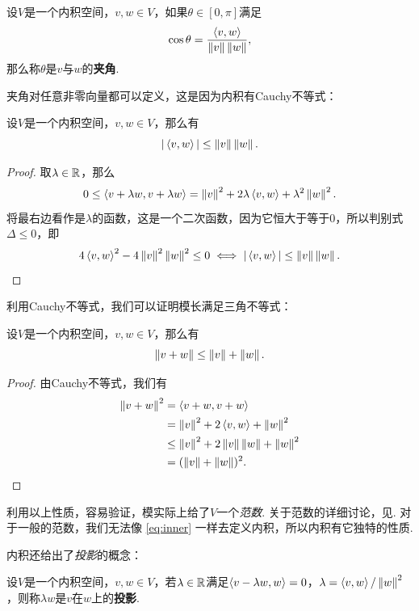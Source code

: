 \begin{definition}[夹角]
设$V$是一个内积空间，$v,w\in V$，如果$\theta\in[0,\pi]$满足
\[
    \cos\theta=\frac{\left\langle{v},{w}\right\rangle}{\left\|v\right\|\left\|w\right\|},
\]
那么称$\theta$是$v$与$w$的\textbf{夹角}. 
\end{definition}

夹角对任意非零向量都可以定义，这是因为内积有Cauchy不等式：

\begin{theorem}[Cauchy不等式]\label{thm:cauchy}
设$V$是一个内积空间，$v,w\in V$，那么有
\[
    |\left\langle{v},{w}\right\rangle|\leq \left\|v\right\|\left\|w\right\|.
\]
\end{theorem}

\begin{proof}
    取$\lambda\in \mathbb{R}$，那么
    \[
        0\leq \left\langle{v+\lambda w},{v+\lambda w}\right\rangle=\left\|v\right\|^2+2\lambda\left\langle{v},{w}\right\rangle+\lambda^2\left\|w\right\|^2.
    \]
将最右边看作是$\lambda$的函数，这是一个二次函数，因为它恒大于等于$0$，所以判别式$\Delta\leq 0$，即
\[
    4\left\langle{v},{w}\right\rangle^2-4\left\|v\right\|^2\left\|w\right\|^2\leq 0\iff |\left\langle{v},{w}\right\rangle|\leq \left\|v\right\|\left\|w\right\|.
\]
\end{proof}

利用Cauchy不等式，我们可以证明模长满足三角不等式：
\begin{theorem}[三角不等式]\label{thm:triangle}
设$V$是一个内积空间，$v,w\in V$，那么有
\[
    \left\|v+w\right\|\leq \left\|v\right\|+\left\|w\right\|.
\]
\end{theorem}

\begin{proof}
由Cauchy不等式，我们有
\begin{align*}
    \left\|v+w\right\|^2 &= \left\langle{v+w},{v+w}\right\rangle \\
    &= \left\|v\right\|^2+2\left\langle{v},{w}\right\rangle+\left\|w\right\|^2 \\
    &\leq \left\|v\right\|^2+2\left\|v\right\|\left\|w\right\|+\left\|w\right\|^2 \\
    &= (\left\|v\right\|+\left\|w\right\|)^2.
\end{align*}
\end{proof}

利用以上性质，容易验证，模实际上给了$V$一个\textit{范数}. 关于范数的详细讨论，见. 对于一般的范数，我们无法像 \eqref{eq:inner} 一样去定义内积，所以内积有它独特的性质. 

内积还给出了\textit{投影}的概念：

\begin{definition}[投影]
设$V$是一个内积空间，$v,w\in V$，若$\lambda\in\mathbb{R}$满足$\left\langle{v-\lambda w},{w}\right\rangle=0$，$\lambda=\left\langle{v},{w}\right\rangle/\left\|w\right\|^2$，则称$\lambda w$是$v$在$w$上的\textbf{投影}. 
\end{definition}

